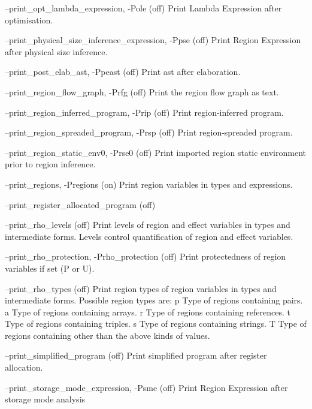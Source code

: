 \documentclass[12pt]{book}
\begin{document}
\begin{scriptcode}
--print_opt_lambda_expression, -Pole                     (off)
     Print Lambda Expression after optimisation.

--print_physical_size_inference_expression, -Ppse        (off)
     Print Region Expression after physical size inference.

--print_post_elab_ast, -Ppeast                           (off)
     Print ast after elaboration.

--print_region_flow_graph, -Prfg                         (off)
     Print the region flow graph as text.

--print_region_inferred_program, -Prip                   (off)
     Print region-inferred program.

--print_region_spreaded_program, -Prsp                   (off)
     Print region-spreaded program.

--print_region_static_env0, -Prse0                       (off)
     Print imported region static environment prior to
     region inference.

--print_regions, -Pregions                                (on)
     Print region variables in types and expressions.

--print_register_allocated_program                       (off)

--print_rho_levels                                       (off)
     Print levels of region and effect variables in types and
     intermediate forms. Levels control quantification of
     region and effect variables.

--print_rho_protection, -Prho_protection                 (off)
     Print protectedness of region variables if set (P or U).

--print_rho_types                                        (off)
     Print region types of region variables in types and
     intermediate forms. Possible region types are:
         p  Type of regions containing pairs.
         a  Type of regions containing arrays.
         r  Type of regions containing references.
         t  Type of regions containing triples.
         s  Type of regions containing strings.
         T  Type of regions containing other than the above
            kinds of values.

--print_simplified_program                               (off)
     Print simplified program after register
     allocation.

--print_storage_mode_expression, -Psme                   (off)
     Print Region Expression after storage mode analysis


\end{scriptcode}
\end{document}
